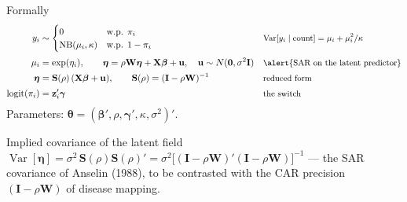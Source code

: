 \documentclass[10pt,aspectratio=169]{beamer}
\newcommand{\bW}{\mathbf{W}}
\newcommand{\bX}{\mathbf{X}}
\newcommand{\bu}{\mathbf{u}}
\newcommand{\bI}{\mathbf{I}}
\newcommand{\bS}{\mathbf{S}}
\newcommand{\bbeta}{\boldsymbol{\beta}}
\newcommand{\bgamma}{\boldsymbol{\gamma}}
\newcommand{\btheta}{\boldsymbol{\theta}}
\DeclareMathOperator{\logit}{logit}
\DeclareMathOperator{\Var}{Var}
\begin{document}
\begin{frame}{Formally}
  \begin{align*}
    y_i &\sim \begin{cases} 0 & \text{w.p. } \pi_i \\ \mathrm{NB}(\mu_i,\kappa) & \text{w.p. } 1-\pi_i\end{cases}
    &&\text{\small $\Var[y_i\mid \text{count}] = \mu_i+\mu_i^2/\kappa$}\\[2pt]
    \mu_i &= \exp(\eta_i), \qquad
    \boldsymbol\eta = \rho\bW\boldsymbol\eta + \bX\bbeta + \bu, \quad \bu\sim N(\mathbf 0,\sigma^2\bI)
    &&\text{\small\alert{SAR on the latent predictor}}\\[2pt]
    \boldsymbol\eta &= \bS(\rho)\,(\bX\bbeta+\bu), \qquad \bS(\rho) = (\bI-\rho\bW)^{-1}
    &&\text{\small reduced form}\\[2pt]
    \logit(\pi_i) &= \mathbf z_i'\bgamma
    &&\text{\small the switch}
  \end{align*}
  \vspace{0.2em}
  Parameters: $\btheta = (\bbeta',\rho,\bgamma',\kappa,\sigma^2)'$.
  \vspace{0.4em}
  \begin{block}{Implied covariance of the latent field}
    $\Var[\boldsymbol\eta] = \sigma^2\,\bS(\rho)\bS(\rho)' = \sigma^2\big[(\bI-\rho\bW)'(\bI-\rho\bW)\big]^{-1}$ --- the SAR covariance of Anselin (1988), to be contrasted with the CAR precision $(\bI-\rho\bW)$ of disease mapping.
  \end{block}
\end{frame}
\end{document}
